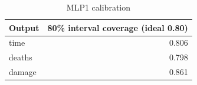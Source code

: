 \begin{table}[ht]
\centering
\small
\begin{tabular}{lr}
\toprule
Output & 80\% interval coverage (ideal 0.80) \\
\midrule
time & 0.806 \\
deaths & 0.798 \\
damage & 0.861 \\
\bottomrule
\end{tabular}
\caption{MLP1 calibration}
\label{tab:mlp1_calibration}
\end{table}
